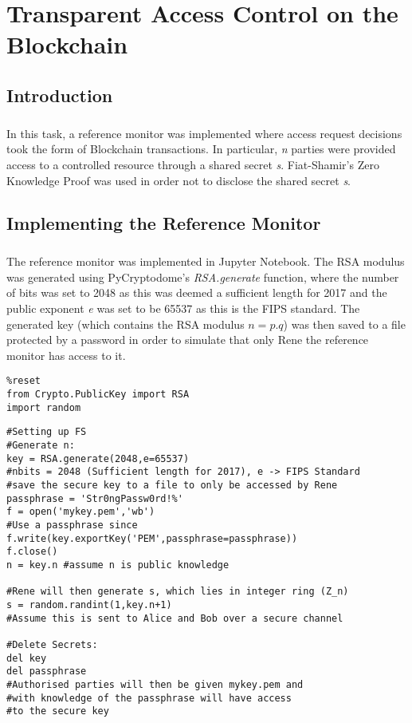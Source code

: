 \chapter{Transparent Access Control on the Blockchain}

\section{Introduction}
\paragraph{ }In this task, a reference monitor was implemented where access request decisions took the form of Blockchain transactions. In particular, \textit{n} parties were provided access to a controlled resource through a shared secret \textit{s}. Fiat-Shamir's Zero Knowledge Proof was used in order not to disclose the shared secret \textit{s}.

\section{Implementing the Reference Monitor}
\paragraph{ }The reference monitor was implemented in Jupyter Notebook. The RSA modulus was generated using PyCryptodome's \textit{RSA.generate} function, where the number of bits was set to 2048 as this was deemed a sufficient length for 2017 and the public exponent \textit{e} was set to be 65537 as this is the FIPS standard. The generated key (which contains the RSA modulus $n=p.q$) was then saved to a file protected by a password in order to simulate that only Rene the reference monitor has access to it.

\begin{lstlisting}
%reset
from Crypto.PublicKey import RSA
import random
\end{lstlisting}

\begin{lstlisting}
#Setting up FS
#Generate n:
key = RSA.generate(2048,e=65537) 
#nbits = 2048 (Sufficient length for 2017), e -> FIPS Standard
#save the secure key to a file to only be accessed by Rene
passphrase = 'Str0ngPassw0rd!%'
f = open('mykey.pem','wb')
#Use a passphrase since
f.write(key.exportKey('PEM',passphrase=passphrase))  
f.close()
n = key.n #assume n is public knowledge

#Rene will then generate s, which lies in integer ring (Z_n)
s = random.randint(1,key.n+1)
#Assume this is sent to Alice and Bob over a secure channel

#Delete Secrets:
del key
del passphrase 
#Authorised parties will then be given mykey.pem and 
#with knowledge of the passphrase will have access 
#to the secure key
\end{lstlisting}

